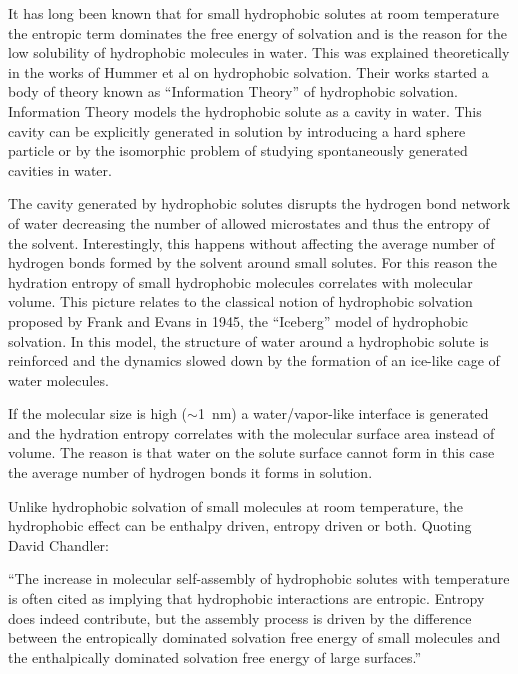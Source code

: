 It has long been known that for small hydrophobic solutes at room temperature the entropic term 
dominates the free energy of 
solvation and is the reason for the low solubility of hydrophobic molecules in 
water.\cite{Chandler2005} This was explained theoretically in the works of Hummer et 
al\cite{garde1996origin,hummer1996information} on hydrophobic solvation. Their works started a body 
of theory known as ``Information Theory'' of hydrophobic solvation. Information Theory models the 
hydrophobic solute as a cavity in water. This cavity can be explicitly generated in solution by 
introducing a hard sphere particle or by the isomorphic problem of studying spontaneously generated 
cavities in water.

The cavity generated by hydrophobic solutes disrupts the hydrogen bond network of water decreasing 
the number of allowed microstates and thus the entropy of the solvent. Interestingly, this happens 
without affecting the average number of hydrogen bonds 
formed by the solvent around small 
solutes.\cite{Pratt1977,KaLum1999,Huang2001,Huang2002,Chandler2005} For this reason 
the hydration entropy of small hydrophobic \newline molecules correlates with molecular volume. 
This picture relates to the classical notion of hydrophobic solvation proposed by Frank and Evans 
in 
1945, the ``Iceberg'' model of hydrophobic solvation. In this model, the 
structure of water around a hydrophobic solute is reinforced and the dynamics slowed down by the 
formation of an ice-like cage of water molecules\cite{frank1945free}.

If the molecular size is high ($\sim$\SI{1}{\nano\meter}) a water/vapor-like interface is 
generated\cite{Willard2014} and the hydration entropy correlates with the 
molecular 
surface area instead of volume.\cite{Chandler2005} The reason is that water on the solute surface 
cannot form in this case the average number of hydrogen bonds it forms in solution.

Unlike hydrophobic solvation of small 
molecules at room temperature, the hydrophobic effect can be enthalpy driven, entropy driven or 
both\cite{Cremer2017,Chandler2005}. Quoting David Chandler: 

``The increase in molecular self-assembly of hydrophobic solutes with temperature is often cited as 
implying that hydrophobic interactions are entropic. Entropy does indeed contribute, but the
assembly process is driven by the difference between the entropically dominated solvation free 
energy of small molecules and the enthalpically dominated solvation free energy of large 
surfaces.'' \cite{Chandler2005}

